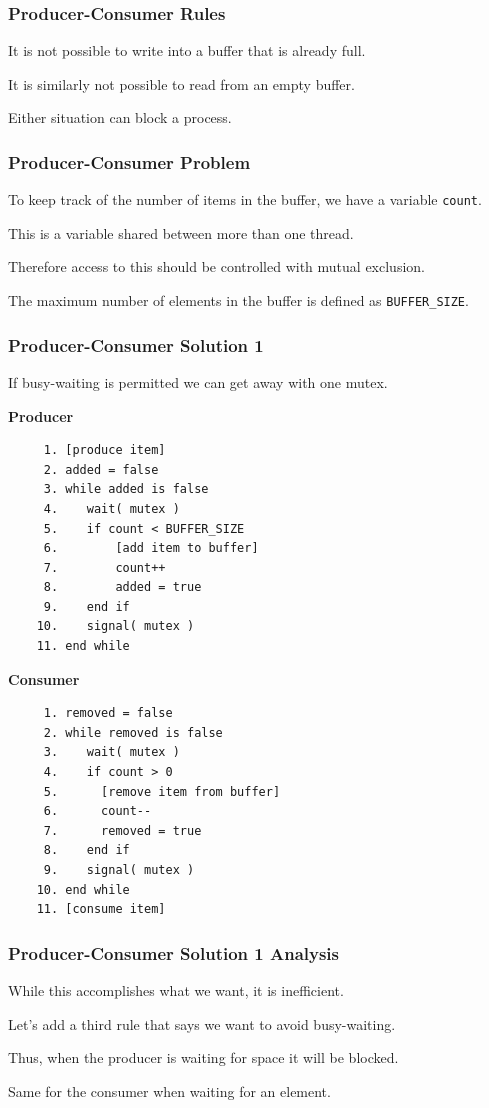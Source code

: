 \begin{frame}
\frametitle{Producer-Consumer Rules}
It is not possible to write into a buffer that is already full. 

It is similarly not possible to read from an empty buffer.

 Either situation can block a process. 

\end{frame}

\begin{frame}
\frametitle{Producer-Consumer Problem}

To keep track of the number of items in the buffer, we have a variable \texttt{count}.

  This is a variable shared between more than one thread. 
  
Therefore access to this should be controlled with mutual exclusion. 

The maximum number of elements in the buffer is defined as \texttt{BUFFER\_SIZE}.


\end{frame}


\begin{frame}[fragile]
\frametitle{Producer-Consumer Solution 1}

If busy-waiting is permitted we can get away with one mutex.


\begin{multicols}{2}
\textbf{Producer}
  \begin{verbatim}
	 1. [produce item]
	 2. added = false
	 3. while added is false
	 4.    wait( mutex )
	 5.    if count < BUFFER_SIZE
	 6.        [add item to buffer]
	 7.        count++
	 8.        added = true
	 9.    end if
	10.    signal( mutex )
	11. end while
  \end{verbatim}
\columnbreak
\textbf{Consumer}
  \begin{verbatim}
	 1. removed = false
	 2. while removed is false
	 3.    wait( mutex )
	 4.    if count > 0
	 5.      [remove item from buffer]
	 6.      count--
	 7.      removed = true
	 8.    end if
	 9.    signal( mutex )
	10. end while
	11. [consume item]
  \end{verbatim}
\end{multicols}
\vspace{-2em}

\end{frame}



\begin{frame}
\frametitle{Producer-Consumer Solution 1 Analysis}

While this accomplishes what we want, it is inefficient. 

Let's add a third rule that says we want to avoid busy-waiting.

Thus, when the producer is waiting for space it will be blocked.

Same for the consumer when waiting for an element. 
\end{frame}



